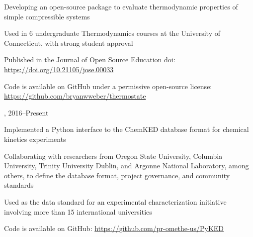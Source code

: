 \begin{innerlist}
    \item Developing an open-source package to evaluate thermodynamic properties of simple compressible systems
    \item Used in 6 undergraduate Thermodynamics courses at the University of Connecticut, with strong student approval
    \item Published in the Journal of Open Source Education doi: \href{https://doi.org/10.21105/jose.00033}{https://doi.org/10.21105/jose.00033}
    \item Code is available on GitHub under a permissive open-source license: \url{https://github.com/bryanwweber/thermostate}
\end{innerlist}

\vspace{\baselineskip}

,  \hfill 2016--Present

\begin{innerlist}
    \item Implemented a Python interface to the ChemKED database format for chemical kinetics experiments
    \item Collaborating with researchers from Oregon State University, Columbia University, Trinity University Dublin, and Argonne National Laboratory, among others, to define the database format, project governance, and community standards
    \item Used as the data standard for an experimental characterization initiative involving more than 15 international universities
    \item Code is available on GitHub: \url{https://github.com/pr-omethe-us/PyKED}
\end{innerlist}





